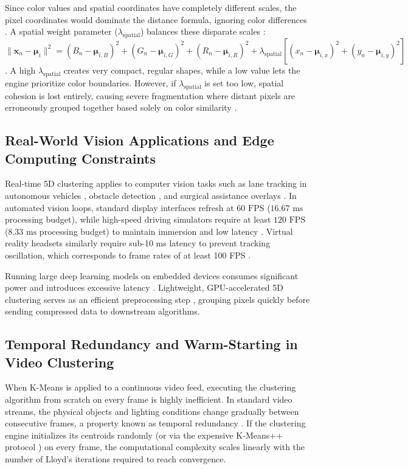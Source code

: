 Since color values and spatial coordinates have completely different scales, the pixel coordinates would dominate the distance formula, ignoring color differences \cite{bishop2006pattern}. A spatial weight parameter ($\lambda_{\text{spatial}}$) balances these disparate scales \cite{shi2000normalized}: $\|\mathbf{x}_n - \boldsymbol{\mu}_i\|^2 = (B_n - \boldsymbol{\mu}_{i,B})^2 + (G_n - \boldsymbol{\mu}_{i,G})^2 + (R_n - \boldsymbol{\mu}_{i,R})^2 + \lambda_{\text{spatial}} \left[ (x_n - \boldsymbol{\mu}_{i,x})^2 + (y_n - \boldsymbol{\mu}_{i,y})^2 \right]$. A high $\lambda_{\text{spatial}}$ creates very compact, regular shapes, while a low value lets the engine prioritize color boundaries. However, if $\lambda_{\text{spatial}}$ is set too low, spatial cohesion is lost entirely, causing severe fragmentation where distant pixels are erroneously grouped together based solely on color similarity \cite{achanta2012slic}.

\subsection{Real-World Vision Applications and Edge Computing Constraints}
Real-time 5D clustering applies to computer vision tasks such as lane tracking in autonomous vehicles \cite{janai2020computer}, obstacle detection \cite{redmon2016you}, and surgical assistance overlays \cite{pham2000current}. In automated vision loops, standard display interfaces refresh at $60\text{ FPS}$ ($16.67\text{ ms}$ processing budget), while high-speed driving simulators require at least $120\text{ FPS}$ ($8.33\text{ ms}$ processing budget) to maintain immersion and low latency \cite{cruden2019simulator}. Virtual reality headsets similarly require sub-10 ms latency to prevent tracking oscillation, which corresponds to frame rates of at least 100 FPS \cite{jerald2009scene}.

Running large deep learning models on embedded devices consumes significant power and introduces excessive latency \cite{paszke2016enet}. Lightweight, GPU-accelerated 5D clustering serves as an efficient preprocessing step \cite{farivar2008parallel}, grouping pixels quickly before sending compressed data to downstream algorithms.

\subsection{Temporal Redundancy and Warm-Starting in Video Clustering}
When K-Means is applied to a continuous video feed, executing the clustering algorithm from scratch on every frame is highly inefficient. In standard video streams, the physical objects and lighting conditions change gradually between consecutive frames, a property known as temporal redundancy \cite{szeliski2022computer}. If the clustering engine initializes its centroids randomly (or via the expensive K-Means++ protocol \cite{arthur2007k}) on every frame, the computational complexity scales linearly with the number of Lloyd's iterations required to reach convergence.

